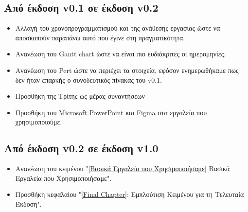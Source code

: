 \documentclass[12pt,a4paper]{article}
\begin{document}
\subsection{Από έκδοση v0.1 σε έκδοση v0.2}
\begin{itemize}
    \item Αλλαγή του χρονοπρογραμματισμού και της ανάθεσης εργασίας ώστε να αποσκοπούν παραπάνω αυτό που έγινε στη πραγματικότητα.
    \item Ανανέωση του Gantt chart ώστε να είναι πιο ευδιάκριτες οι ημερομηνίες.
    \item Ανανέωση του Pert ώστε να περιέχει τα στοιχεία, εφόσον ενημερωθήκαμε πως δεν ήταν επαρκής ο συνοδευτικός πίνακας του v0.1.
    \item Προσθήκη της Τρίτης ως μέρας συναντήσεων
    \item Προσθήκη του Microsoft PowerPoint και Figma στα εργαλεία που χρησιμοποιούμε.
\end{itemize}

\subsection{Από έκδοση v0.2 σε έκδοση v1.0}
\begin{itemize}
    \item Ανανέωση του κειμένου "\ref{Βασικά Εργαλεία που Χρησιμοποιήσαμε} Βασικά Εργαλεία που Χρησιμοποιήσαμε".
    \item Προσθήκη κεφαλαίου "\ref{Final Chapter}: Εμπλούτιση Κειμένου για τη Τελευταία Έκδοση".
\end{itemize}
\end{document}
